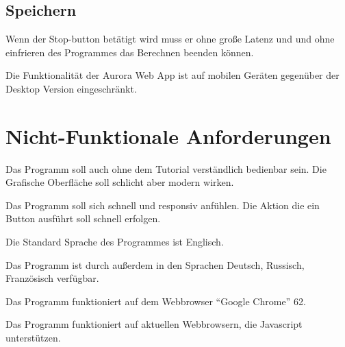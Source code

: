 \documentclass[parskip=full,11pt,twoside]{scrartcl}
\begin{document}
\subsection{Speichern}

Wenn der Stop-button betätigt wird muss er ohne große Latenz und und ohne einfrieren des Programmes das Berechnen beenden können.

Die Funktionalität der Aurora Web App ist auf mobilen Geräten gegenüber der Desktop Version eingeschränkt.




\section{Nicht-Funktionale Anforderungen}

Das Programm soll auch ohne dem Tutorial verständlich bedienbar sein.
Die Grafische Oberfläche soll schlicht aber modern wirken. 

Das Programm soll sich schnell und responsiv anfühlen. Die Aktion die ein Button ausführt soll schnell erfolgen. 


Die Standard Sprache des Programmes ist Englisch.

Das Programm ist durch außerdem in den Sprachen Deutsch, Russisch, Französisch verfügbar.


Das Programm funktioniert auf dem Webbrowser \enquote{Google Chrome} 62.

Das Programm funktioniert auf aktuellen Webbrowsern, die Javascript unterstützen.
\end{document}
